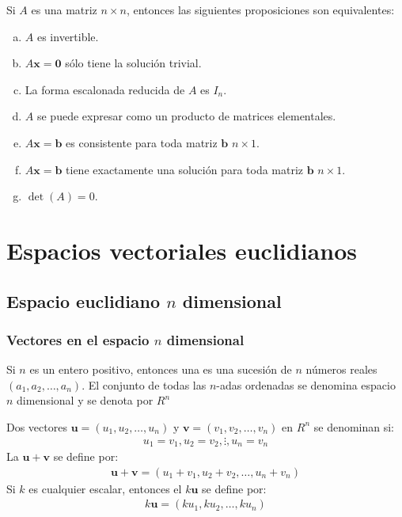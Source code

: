 \documentclass[a4paper,12pt]{article}
\begin{document}
\begin{theorem}
  Si $A$ es una matriz $n\times n$, entonces las siguientes proposiciones son
  equivalentes:
  \begin{enumerate}[(a)]
    \item $A$ es invertible.
    \item $A\mathbf{x}=\mathbf{0}$ sólo tiene la solución trivial.
    \item La forma escalonada reducida de $A$ es $I_n$.
    \item $A$ se puede expresar como un producto de matrices elementales.
    \item $A\mathbf{x}=\mathbf{b}$ es consistente para toda matriz
      $\mathbf{b}$ $n\times 1$.
    \item $A\mathbf{x}=\mathbf{b}$ tiene exactamente una solución para toda
      matriz $\mathbf{b}$ $n\times 1$.
    \item $\det(A)=0$.
  \end{enumerate}
  \label{theo:resumen_matriz_det}
\end{theorem}

\newpage

\section{Espacios vectoriales euclidianos}

\subsection{Espacio euclidiano $n$ dimensional}

\subsubsection{Vectores en el espacio $n$ dimensional}
\label{sec:vec_espacio_n}
\begin{concept}
  Si $n$ es un entero positivo, entonces una  es una
  sucesión de $n$ números reales $(a_1,a_2,\ldots ,a_n)$. El conjunto de todas
  las $n$-adas ordenadas se denomina espacio $n$ dimensional y se denota por
  $R^n$
\end{concept}

\begin{concept}
  Dos vectores $\mathbf{u}=(u_1,u_2,\ldots,u_n)$ y
  $\mathbf{v}=(v_1,v_2,\ldots,v_n)$ en $R^n$ se denominan  si:
  \begin{align*}
    u_1=v_1, u_2=v_2,\vdots ,u_n=v_n
  \end{align*}
  La  $\mathbf{u}+\mathbf{v}$ se define por:
  \begin{align*}
    \mathbf{u}+\mathbf{v}=(u_1+v_1,u_2+v_2,\ldots,u_n+v_n)
  \end{align*}
  Si $k$ es cualquier escalar, entonces el  $k\mathbf{u}$
  se define por:
  \begin{align*}
    k\mathbf{u}=(ku_1,ku_2,\ldots,ku_n)
  \end{align*}
\end{concept}
\end{document}
